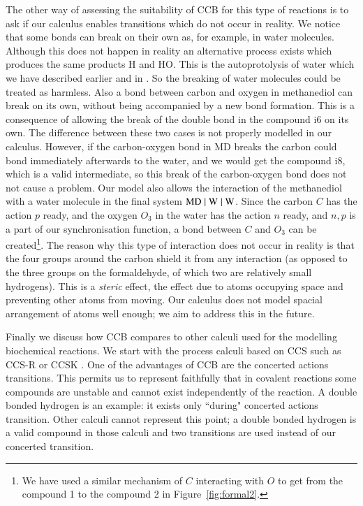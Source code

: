 The other way of assessing the suitability of CCB for this type of reactions is to ask if
our calculus enables transitions which do not occur in reality. 
We notice that some bonds can break on their own as, for example, in water molecules. 
Although this does not happen in reality an alternative process exists which produces the same
products H and HO. This is the autoprotolysis of water which we have described earlier and in 
\cite{merevcomp2015}. 
So the breaking of water molecules could be treated as harmless.  
Also a bond between carbon and oxygen in methanediol can break on its own, without being
accompanied by a new bond formation.
This is a consequence of allowing the break of 
the double bond in the compound i6 on its own. The difference between these two cases is not properly 
modelled in our calculus. However, if the carbon-oxygen bond in MD breaks the carbon could 
bond immediately afterwards to the water, and we would get the compound i8, which is 
a valid intermediate, so this break of the carbon-oxygen bond does not not cause a problem.
Our model also allows the 
interaction of the methanediol with a water molecule in the final system 
$\mathrm{MD \; \vert \; W \; \vert \; W}$.
Since the carbon $C$ has the action $p$ ready, and the oxygen $O_3$ in the water has the action $n$ ready, 
and $n,p$ is a part of our synchronisation function, a bond between $C$ and $O_3$ can be 
created\footnote{We have used a similar mechanism of $C$ interacting with $O$ 
to get from the compound 1 to the compound 2 in Figure~\ref{fig:formal2}.}.  
The reason why this type of interaction does not occur in
reality is that the four groups around the carbon shield it from any interaction 
(as opposed to the three groups on the formaldehyde, of which two are relatively small hydrogens). 
This is a \emph{steric} effect, the effect due to atoms occupying space and preventing other atoms 
from moving. Our calculus does not model spacial arrangement of atoms well enough; we aim to
address this in the future.


Finally we discuss how CCB compares to other calculi used for the modelling biochemical reactions. 
We start with the process calculi based on CCS such as \mbox{CCS-R} \cite{danos2004ccsr,Danos2007ccsr}
or CCSK \cite{PhillipsUlidowski06,Irek2007}. One of the advantages of CCB 
are the concerted actions transitions. This permits us to represent faithfully that in covalent
reactions some compounds are unstable and cannot exist independently of the reaction. A double bonded 
hydrogen is an example: it exists only ``during" concerted actions transition. Other calculi cannot
represent this point; a double bonded hydrogen is a valid compound in those calculi
and two transitions are used instead of our concerted transition.

